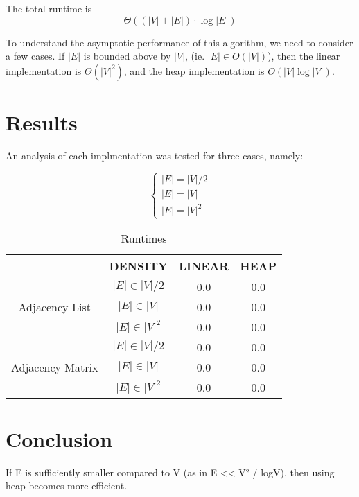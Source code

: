 \documentclass[technote]{IEEEtran}
\begin{document}
The total runtime is 
$$\Theta ( (|V| + |E|) \cdot \log|E| )$$


To understand the asymptotic performance of this algorithm, 
we need to consider a few cases.
If $|E|$ is bounded above by $|V|$, (ie. $|E| \in O(|V|)$), 
then the linear implementation is $\Theta(|V|^2)$, 
and the heap implementation is $O(|V| \log |V|)$.



\section{Results}

An analysis of each implmentation was tested for 
three cases, namely: 

$$
\begin{cases}
    |E| = |V|/2 \\
    |E| = |V|  \\
    |E| = |V|^2
\end{cases}
$$

\begin{table}[!ht]
    \caption{Runtimes}
    \centering
    \begin{tabular}{|c|c|c|c|}
        \hline
        & DENSITY & LINEAR & HEAP \\ \hline
        \multirow{3}{*}{Adjacency List} 
        & $|E| \in |V|/2$ & 0.0 & 0.0 \\ [0.5ex]\cline{2-4}
        & $|E| \in |V|$ & 0.0 & 0.0 \\ \cline{2-4}
        & $|E| \in |V|^2$ & 0.0 & 0.0 \\ \hline
        \multirow{3}{*}{Adjacency Matrix}
        & $|E| \in |V|/2$ & 0.0 & 0.0 \\ \cline{2-4}
        & $|E| \in |V|$ & 0.0 & 0.0 \\ \cline{2-4}
        & $|E| \in |V|^2$ & 0.0 & 0.0 \\ \hline
    \end{tabular}
\end{table}







\section{Conclusion}
If  E is sufficiently smaller compared to V (as in E << V² / logV), then using heap becomes more efficient.

\lipsum[1-2]

\nocite{*}


\end{document}
